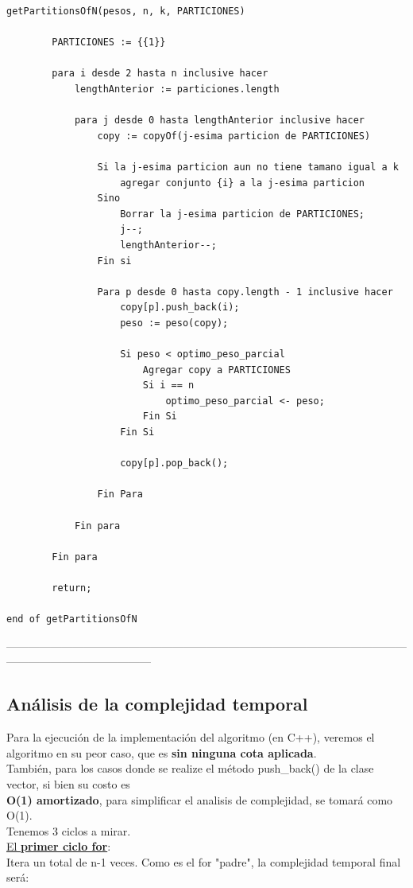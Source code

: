 \documentclass[10pt,a4paper]{article}
\begin{document}
\begin{lstlisting}
getPartitionsOfN(pesos, n, k, PARTICIONES)

		PARTICIONES := {{1}}
	
		para i desde 2 hasta n inclusive hacer
			lengthAnterior := particiones.length

			para j desde 0 hasta lengthAnterior inclusive hacer		
				copy := copyOf(j-esima particion de PARTICIONES)

				Si la j-esima particion aun no tiene tamano igual a k
					agregar conjunto {i} a la j-esima particion			
				Sino
					Borrar la j-esima particion de PARTICIONES;
					j--;
					lengthAnterior--;
				Fin si
			
				Para p desde 0 hasta copy.length - 1 inclusive hacer
					copy[p].push_back(i);
					peso := peso(copy);
					
					Si peso < optimo_peso_parcial		
						Agregar copy a PARTICIONES
						Si i == n
							optimo_peso_parcial <- peso;					
						Fin Si
					Fin Si
					
					copy[p].pop_back();
					
				Fin Para
			
			Fin para
	
		Fin para

		return;

end of getPartitionsOfN
\end{lstlisting}
---------------------------------------------------------------------------------------------------------------------------------------------------
\newpage
\subsection{Análisis de la complejidad temporal}
Para la ejecución de la implementación del algoritmo (en C++), veremos el algoritmo en su peor caso, que es \textbf{sin ninguna cota aplicada}.\\
También, para los casos donde se realize el método push\_back() de la clase vector, si bien su costo es\\ \textbf{O(1) amortizado}, para simplificar el analisis de complejidad, se tomará como O(1).\\

Tenemos 3 ciclos a mirar.\\

\noindent \underline{El \textbf{primer ciclo for}}:\\
Itera un total de n-1 veces. Como es el for "padre", la complejidad temporal final será:
\end{document}
